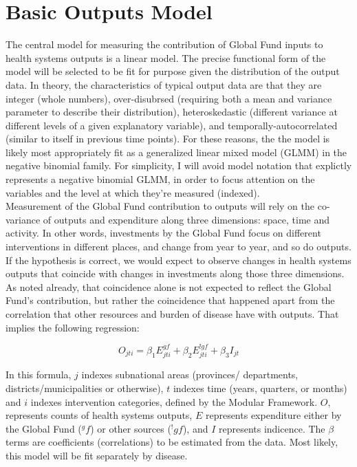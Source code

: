 \documentclass[twocolumn]{bmcart}%
\begin{document}

\section{Basic Outputs Model}

The central model for measuring the contribution of Global Fund inputs to health systems outputs is a linear model. The precise functional form of the model will be selected to be fit for purpose given the distribution of the output data. In theory, the characteristics of typical output data are that they are integer (whole numbers), over-disubrsed (requiring both a mean and variance parameter to describe their distribution), heteroskedastic (different variance at different levels of a given explanatory variable), and temporally-autocorrelated (similar to itself in previous time points). For these reasons, the the model is likely most appropriately fit as a generalized linear mixed model (GLMM) in the negative binomial family. For simplicity, I will avoid model notation that explictly represents a negative binomial GLMM, in order to focus attention on the variables and the level at which they're measured (indexed). \\

Measurement of the Global Fund contribution to outputs will rely on the co-variance of outputs and expenditure along three dimensions: space, time and activity. In other words, investments by the Global Fund focus on different interventions in different places, and change from year to year, and so do outputs. If the hypothesis is correct, we would expect to observe changes in health systems outputs that coincide with changes in investments along those three dimensions. As noted already, that coincidence alone is not expected to reflect the Global Fund's contribution, but rather the coincidence that happened apart from the correlation that other resources and burden of disease have with outputs. That implies the following regression:

\begin{equation} \label{basic_model}
O_{jti} = \beta_1 E^{gf}_{jti} + \beta_2 E^{!gf}_{jti} + \beta_3 I_{jt}
\end{equation}

In this formula, $j$ indexes subnational areas (provinces/ departments, districts/municipalities or otherwise), $t$ indexes time (years, quarters, or months) and $i$ indexes intervention categories, defined by the Modular Framework. $O$, represents counts of health systems outputs, $E$ represents expenditure either by the Global Fund ($^gf$) or other sources ($^!gf$), and $I$ represents indicence. The $\beta$ terms are coefficients (correlations) to be estimated from the data. Most likely, this model will be fit separately by disease.\\
\end{document}
